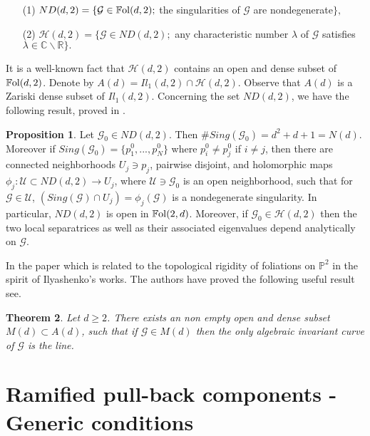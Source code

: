 \documentclass{amsart}
\newtheorem{theorem}{Theorem}[section]
\theoremstyle{definition}
\theoremstyle{proposition}
\newtheorem{proposition}[theorem]{Proposition}
\numberwithin{equation}{section}
\theoremstyle{main}
\begin{document}
\begin{enumerate}
\item [(1)]$ND(d,2)=\{ \mathcal{G} \in \mathbb{F}{\rm{ol}}(d,2);$ the singularities of $\mathcal G$ are nondegenerate$\},$
\item[(2)] $\mathcal{H}(d,2)=\{\mathcal{G} \in ND(d,2);$ any characteristic number $\lambda$ of $\mathcal{G}$ satisfies $\lambda \in \mathbb C \backslash \mathbb R\}.$
\end{enumerate}
It is a well-known fact  \cite{ln1} that $\mathcal{H}(d,2)$ contains an open and dense subset of $\mathbb{F}{\rm{ol}}(d,2)$. Denote by $A(d)=Il_{1}(d,2)\cap \mathcal{H}(d,2).$ Observe that $A(d)$ is a Zariski dense subset of $Il_{1}(d,2)$. Concerning the set $ND(d,2)$, we have the following result, proved in \cite{ln1}.

\begin{proposition}
Let  $\mathcal G_{0} \in ND(d,2)$. Then $\#Sing(\mathcal G_{0})=d^2+d+1=N(d)$. Moreover if $Sing(\mathcal G_{0})=\{p_{1}^0,...,p_{N}^0\}$ where $p_{i}^0\neq p_{j}^0$ if $i\neq j$, then there are connected neighborhoods $U_{j} \ni p_{j}$, pairwise disjoint, and holomorphic maps $\phi_{j}:\mathcal U\subset ND(d,2) \to U_{j}$, where $\mathcal U \ni \mathcal G_{0}$ is an open neighborhood, such that for $\mathcal G \in \mathcal U$, $(Sing(\mathcal G)\cap U_{j})=\phi_{j}(\mathcal G)$  is a nondegenerate singularity.  In particular, $ND(d,2)$ is open in $\mathbb{F}{\rm{ol}}(2,d)$. Moreover, if $\mathcal G_{0} \in \mathcal{H}(d,2)$ then the two local separatrices as well as their associated eigenvalues depend analytically on $\mathcal {G}$.
\end{proposition}
\vskip0.2cm
 In the paper \cite{lnssc} which is related to the topological rigidity of foliations on $\mathbb P^2$ in the spirit of Ilyashenko's works. The authors have proved the following useful result see\cite[Theorem 3, p.385]{lnssc}. \begin{theorem} Let $d\geq 2$. There exists an non empty open and dense subset $M\left(d\right)\subset A\left(d\right)$, such that if $\mathcal G \in M\left(d\right)$  then the only algebraic invariant curve of $\mathcal G$ is the line. 
\end{theorem}

\section{Ramified pull-back components - Generic conditions}\label{section4}
\end{document}
